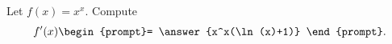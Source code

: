\documentclass{ximera}
\author{Steven Gubkin}
\begin{document}
\begin{exercise}

Let $f(x) = x^x$. Compute
\[
f'(x) \begin{prompt}= \answer{x^x(\ln(x)+1)}
\end{prompt}.
\]



\end{exercise}
\end{document}
